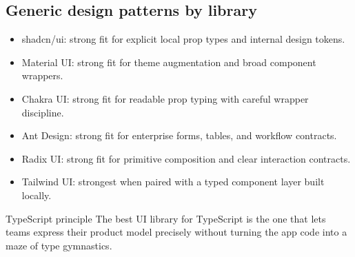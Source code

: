 \subsection{Generic design patterns by library}
\begin{itemize}[leftmargin=*, itemsep=0.35em]
  \item shadcn/ui: strong fit for explicit local prop types and internal design tokens.
  \item Material UI: strong fit for theme augmentation and broad component wrappers.
  \item Chakra UI: strong fit for readable prop typing with careful wrapper discipline.
  \item Ant Design: strong fit for enterprise forms, tables, and workflow contracts.
  \item Radix UI: strong fit for primitive composition and clear interaction contracts.
  \item Tailwind UI: strongest when paired with a typed component layer built locally.
\end{itemize}

\begin{highlightbox}{TypeScript principle}
The best UI library for TypeScript is the one that lets teams express their product model precisely without turning the app code into a maze of type gymnastics.
\end{highlightbox}
